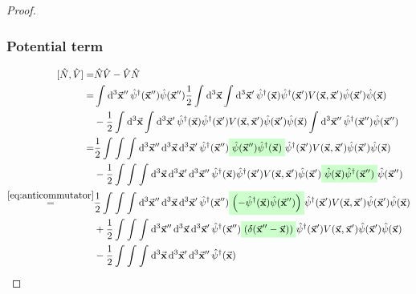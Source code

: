 \documentclass[11pt, a4paper, twoside, openright]{article}
\begin{document}
\begin{proof}
\subsubsection*{Potential term}
\begin{equation*}
\begin{split}
[\hat{N},\hat{V}  ]  =&  \hat{N}\hat{V} - \hat{V}\hat{N}     \\
    =& \int_{}^{} \dd[3]{\va{x}''} \hat{\psi }^\dag (\va{x}'') \hat{\psi }(\va{x}'') \frac{1}{2}  \int_{}^{} \dd[3]{\va{x}}
     \int_{}^{} \dd[3]{\va{x}'} \hat{\psi } ^\dag (\va{x})
     \hat{\psi } ^\dag (\va{x}') V (\va{x},\va{x}') \hat{\psi } (\va{x}') \hat{\psi } (\va{x}) \\
     &-
     \frac{1}{2}  \int_{}^{} \dd[3]{\va{x}}
      \int_{}^{} \dd[3]{\va{x}'} \hat{\psi } ^\dag (\va{x})
      \hat{\psi } ^\dag (\va{x}') V (\va{x},\va{x}') \hat{\psi } (\va{x}') \hat{\psi } (\va{x})
      \int_{}^{} \dd[3]{\va{x}''} \hat{\psi }^\dag (\va{x}'') \hat{\psi }(\va{x}'') \\
    =&
    \frac{1}{2} \int_{}^{} \int_{}^{} \int_{}^{} \dd[3]{\va{x}''} \dd[3]{\va{x}}  \dd[3]{\va{x}'}
    \hat{\psi }^\dag (\va{x}'') \mathcolorbox{green!20}{ \hat{\psi }(\va{x}'') \hat{\psi } ^\dag (\va{x}) }
    \hat{\psi } ^\dag (\va{x}') V (\va{x},\va{x}') \hat{\psi } (\va{x}') \hat{\psi } (\va{x}) \\
    &- \frac{1}{2} \int_{}^{} \int_{}^{} \int_{}^{} \dd[3]{\va{x}} \dd[3]{\va{x}'} \dd[3]{\va{x}''}
    \hat{\psi } ^\dag (\va{x})
    \hat{\psi } ^\dag (\va{x}') V (\va{x},\va{x}') \hat{\psi } (\va{x}') \mathcolorbox{green!20}{\hat{\psi } (\va{x}) \hat{\psi }^\dag (\va{x}'')} \hat{\psi }(\va{x}'') \\
     \overset{\eqref{eq:anticommutator}}{=} &
    \frac{1}{2} \int_{}^{} \int_{}^{} \int_{}^{} \dd[3]{\va{x}''} \dd[3]{\va{x}}  \dd[3]{\va{x}'}
    \hat{\psi }^\dag (\va{x}'') \mathcolorbox{green!20}{ \qty(-  \hat{\psi } ^\dag (\va{x}) \hat{\psi }(\va{x}'')  ) }
    \hat{\psi } ^\dag (\va{x}') V (\va{x},\va{x}') \hat{\psi } (\va{x}') \hat{\psi } (\va{x}) \\
    &+
    \frac{1}{2} \int_{}^{} \int_{}^{} \int_{}^{} \dd[3]{\va{x}''} \dd[3]{\va{x}}  \dd[3]{\va{x}'}
    \hat{\psi }^\dag (\va{x}'') \mathcolorbox{green!20}{ \qty(\delta (\va{x}''-\va{x}) ) }
    \hat{\psi } ^\dag (\va{x}') V (\va{x},\va{x}') \hat{\psi } (\va{x}') \hat{\psi } (\va{x}) \\
    &-
    \frac{1}{2} \int_{}^{} \int_{}^{} \int_{}^{} \dd[3]{\va{x}} \dd[3]{\va{x}'} \dd[3]{\va{x}''}
    \hat{\psi } ^\dag (\va{x})

\end{split}
\end{equation*}
\end{proof}
\end{document}
